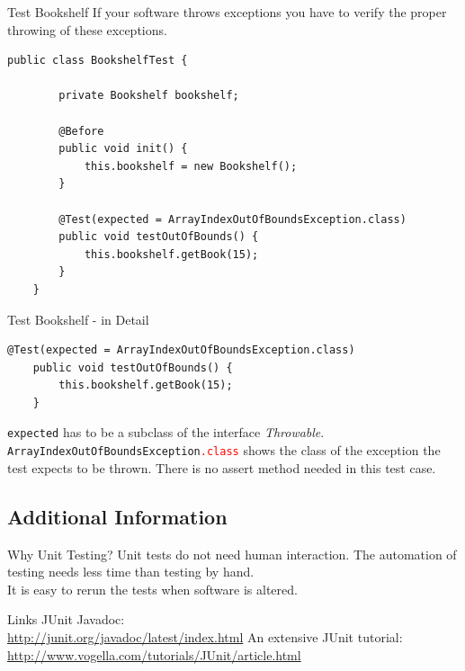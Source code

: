 \begin{frame}[fragile]{Test Bookshelf}
	If your software throws exceptions you have to verify the proper throwing of these exceptions.
	\begin{lstlisting}[basicstyle=\ttfamily\scriptsize, escapechar=!]
	public class BookshelfTest {
	
	    private Bookshelf bookshelf;

	    @Before
	    public void init() {
	        this.bookshelf = new Bookshelf();
	    }

	    @Test(expected = ArrayIndexOutOfBoundsException.class)
	    public void testOutOfBounds() {
	        this.bookshelf.getBook(15);
	    }
	}
	\end{lstlisting}
\end{frame}

\begin{frame}[fragile]{Test Bookshelf - in Detail}
	\begin{lstlisting}[basicstyle=\ttfamily\scriptsize, escapechar=!]
	@Test(expected = ArrayIndexOutOfBoundsException.class)
	public void testOutOfBounds() {
	    this.bookshelf.getBook(15);
	}
	\end{lstlisting}
	\vfill
	\texttt{expected} has to be a subclass of the interface \emph{Throwable}.
	\vfill
	\texttt{ArrayIndexOutOfBoundsException\textcolor{red}{.class}} shows the class of the exception
	the test expects to be thrown.
	\vfill
	There is no assert method needed in this test case.
\end{frame}

\subsection{Additional Information}
\begin{frame}{Why Unit Testing?}
	Unit tests do not need human interaction. The automation of testing needs less time than testing by hand. \\
	It is easy to rerun the tests when software is altered.
\end{frame}

\begin{frame}{Links}
	JUnit Javadoc: \\
	\url{http://junit.org/javadoc/latest/index.html}
	\vfill
	An extensive JUnit tutorial:
	\url{http://www.vogella.com/tutorials/JUnit/article.html}
\end{frame}
